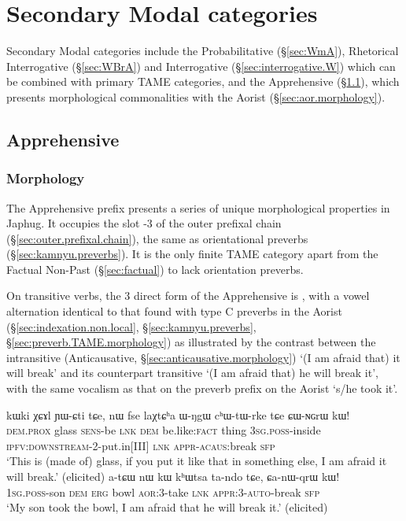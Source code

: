  
\section{Secondary Modal categories}  \label{sec:second.modal}
Secondary Modal categories include the Probabilitative (§\ref{sec:WmA}), Rhetorical Interrogative (§\ref{sec:WBrA}) and Interrogative (§\ref{sec:interrogative.W}) which can be combined with primary TAME categories, and the Apprehensive (§\ref{sec:apprehensive}), which presents morphological commonalities with the Aorist (§\ref{sec:aor.morphology}).

  \subsection{Apprehensive} \label{sec:apprehensive}
  
    \subsubsection{Morphology} \label{sec:apprehensive.morphology}
The Apprehensive prefix  presents a series of unique morphological properties in Japhug. It occupies the slot -3 of the outer prefixal chain (§\ref{sec:outer.prefixal.chain}), the same as orientational preverbs (§\ref{sec:kamnyu.preverbs}). It is the only finite TAME category apart from the Factual Non-Past (§\ref{sec:factual}) to lack orientation preverbs.

On transitive verbs, the 3\flobv{} direct form of the Apprehensive is , with a vowel alternation identical to that found with type C preverbs in the Aorist (§\ref{sec:indexation.non.local}, §\ref{sec:kamnyu.preverbs}, §\ref{sec:preverb.TAME.morphology}) as illustrated by the contrast between the intransitive (Anticausative, §\ref{sec:anticausative.morphology})  `(I am afraid that) it will break' and its counterpart transitive  `(I am afraid that) he will break it', with the same vocalism as that on the preverb  prefix on the Aorist   `s/he took it'.

\begin{exe}
\ex \label{ex:NGrW.qrW}
\begin{xlist}
\ex \label{ex:CWNGrW}
\gll kɯki χɕɤl ɲɯ-ɕti tɕe, nɯ fse laχtɕʰa ɯ-ŋgɯ cʰɯ-tɯ-rke tɕe ɕɯ-ɴɢrɯ kɯ!  \\
\textsc{dem}.\textsc{prox} glass \textsc{sens}-be \textsc{lnk} \textsc{dem} be.like:\textsc{fact}  thing \textsc{3sg}.\textsc{poss}-inside \textsc{ipfv}:\textsc{downstream}-2-put.in[III] \textsc{lnk} \textsc{appr}-\textsc{acaus}:break \textsc{sfp} \\
\glt `This is (made of) glass, if you put it like that in something else, I am afraid it will break.' (elicited)
\ex \label{ex:CanWqrW}
\gll a-tɕɯ nɯ kɯ kʰɯtsa ta-ndo tɕe, ɕa-nɯ-qrɯ kɯ! \\
\textsc{1sg}.\textsc{poss}-son \textsc{dem} \textsc{erg} bowl \textsc{aor}:3\flobv{}-take \textsc{lnk} \textsc{appr}:3\flobv{}-\textsc{auto}-break \textsc{sfp} \\
\glt `My son took the bowl, I am afraid that he will break it.' (elicited)
\end{xlist}
 \end{exe}
 
